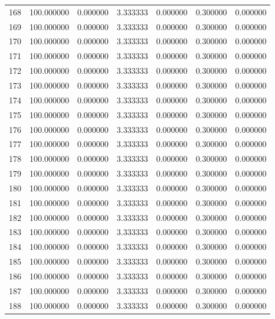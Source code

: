 \begin{tabular}{rrrrrrr}
168 & 100.000000 &    0.000000 &  3.333333 &    0.000000 &    0.300000 &  0.000000 \\
169 & 100.000000 &    0.000000 &  3.333333 &    0.000000 &    0.300000 &  0.000000 \\
170 & 100.000000 &    0.000000 &  3.333333 &    0.000000 &    0.300000 &  0.000000 \\
171 & 100.000000 &    0.000000 &  3.333333 &    0.000000 &    0.300000 &  0.000000 \\
172 & 100.000000 &    0.000000 &  3.333333 &    0.000000 &    0.300000 &  0.000000 \\
173 & 100.000000 &    0.000000 &  3.333333 &    0.000000 &    0.300000 &  0.000000 \\
174 & 100.000000 &    0.000000 &  3.333333 &    0.000000 &    0.300000 &  0.000000 \\
175 & 100.000000 &    0.000000 &  3.333333 &    0.000000 &    0.300000 &  0.000000 \\
176 & 100.000000 &    0.000000 &  3.333333 &    0.000000 &    0.300000 &  0.000000 \\
177 & 100.000000 &    0.000000 &  3.333333 &    0.000000 &    0.300000 &  0.000000 \\
178 & 100.000000 &    0.000000 &  3.333333 &    0.000000 &    0.300000 &  0.000000 \\
179 & 100.000000 &    0.000000 &  3.333333 &    0.000000 &    0.300000 &  0.000000 \\
180 & 100.000000 &    0.000000 &  3.333333 &    0.000000 &    0.300000 &  0.000000 \\
181 & 100.000000 &    0.000000 &  3.333333 &    0.000000 &    0.300000 &  0.000000 \\
182 & 100.000000 &    0.000000 &  3.333333 &    0.000000 &    0.300000 &  0.000000 \\
183 & 100.000000 &    0.000000 &  3.333333 &    0.000000 &    0.300000 &  0.000000 \\
184 & 100.000000 &    0.000000 &  3.333333 &    0.000000 &    0.300000 &  0.000000 \\
185 & 100.000000 &    0.000000 &  3.333333 &    0.000000 &    0.300000 &  0.000000 \\
186 & 100.000000 &    0.000000 &  3.333333 &    0.000000 &    0.300000 &  0.000000 \\
187 & 100.000000 &    0.000000 &  3.333333 &    0.000000 &    0.300000 &  0.000000 \\
188 & 100.000000 &    0.000000 &  3.333333 &    0.000000 &    0.300000 &  0.000000 \\

\end{tabular}
